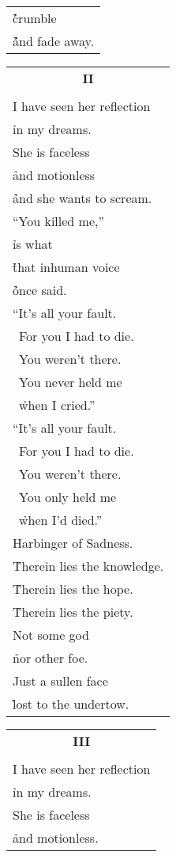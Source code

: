 \documentclass{article}
\begin{document}
\begin{center}
\begin{tabular}{l}
\h\h\h\h crumble \\
\h\h\h\h\h and fade away. \\
\end{tabular}
\begin{tabular}{l}
\multicolumn{1}{c}{\large\textbf{II}} \\
\\
I have seen her reflection \\
\h in my dreams. \\
She is faceless \\
\h and motionless \\
\h\h and she wants to scream. \\ %
``You killed me,'' \\
\h is what \\
\h\h that inhuman voice \\
\h\h\h once said. \\
``It's all your fault. \\
\ For you I had to die. \\
\ You weren't there. \\
\ You never held me \\
\ \h when I cried.'' \\
``It's all your fault. \\
\ For you I had to die. \\
\ You weren't there. \\
\ You only held me \\
\ \h when I'd died.'' \\
Harbinger of Sadness. \\
\h Therein lies the knowledge. \\
\h Therein lies the hope. \\
\h Therein lies the piety. \\
Not some god \\
\h nor other foe. \\ %
Just a sullen face \\
\h lost to the undertow. \\
\end{tabular}
\begin{tabular}{l}
\multicolumn{1}{c}{\large\textbf{III}} \\
\\
I have seen her reflection \\
\h in my dreams. \\
She is faceless \\
\h and motionless. \\

\end{tabular}
\end{center}
\end{document}
